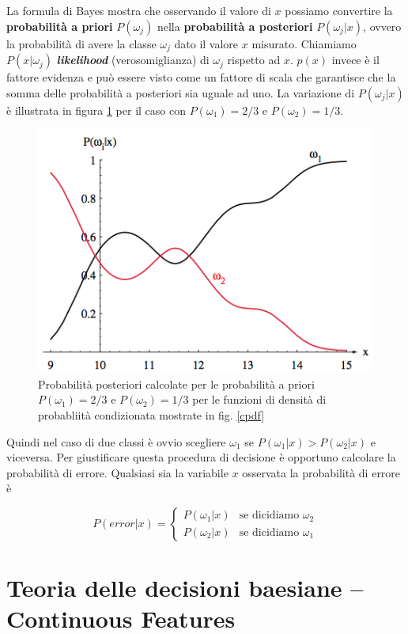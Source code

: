 La formula di Bayes mostra che osservando il valore di $x$ possiamo convertire la \textbf{probabilità a priori} $P(\omega_j)$ nella \textbf{probabilità a posteriori} $P(\omega_j|x)$, ovvero la probabilità di avere la classe $\omega_j$ dato il valore $x$ misurato. Chiamiamo $P(x|\omega_j)$ \emph{\textbf{likelihood}} (verosomiglianza) di $\omega_j$ rispetto ad $x$. $p(x)$ invece è il fattore evidenza e può essere visto come un fattore di scala che garantisce che la somma delle probabilità a posteriori sia uguale ad uno. La variazione di $P(\omega_j|x)$ è illustrata in figura \ref{prob_post} per il caso con $P(\omega_1) = 2/3$ e $P(\omega_2) = 1/3$.
\begin{figure}
\centering
\includegraphics[scale=0.6]{img/prob_post.png}
\caption{Probabilità posteriori calcolate per le probabilità a priori $P(\omega_1) = 2/3$ e $P(\omega_2) = 1/3$ per le funzioni di densità di probabliità condizionata mostrate in fig. \ref{cpdf}}
\label{prob_post}
\end{figure}
\noindent Quindi nel caso di due classi è ovvio scegliere $\omega_1$ se $P(\omega_1|x) > P(\omega_2|x)$ e viceversa. Per giustificare questa procedura di decisione è opportuno calcolare la probabilità di errore. Qualsiasi sia la variabile $x$ osservata la probabilità di errore è

\[
P(error | x)=
\begin{cases}
P(\omega_1|x) & \text{se dicidiamo $\omega_2$} \\
P(\omega_2|x) & \text{se dicidiamo $\omega_1$} 
\end{cases}
\]


\section{Teoria delle decisioni baesiane -- Continuous Features}

